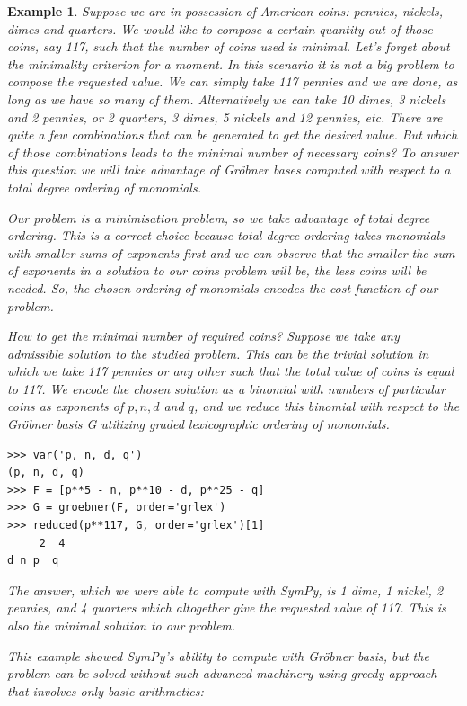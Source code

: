 \documentclass[12pt]{article}
\newtheorem{example}[theorem]{Example}
\begin{document}
\begin{example}
{\rm
Suppose we are in possession of American coins: pennies, nickels,
dimes and quarters. We would like to compose a certain quantity out of
those coins, say 117, such that the number of coins used is
minimal. Let's forget about the minimality criterion for a moment. In
this scenario it is not a big problem to compose the requested
value. We can simply take 117 pennies and we are done, as long as we
have so many of them. Alternatively we can take 10 dimes, 3 nickels
and 2 pennies, or 2 quarters, 3 dimes, 5 nickels and 12 pennies,
etc. There are quite a few combinations that can be generated to get
the desired value. But which of those combinations leads to the
minimal number of necessary coins? To answer this question we will
take advantage of Gr\"obner bases computed with respect to a total
degree ordering of monomials.

Our problem is a minimisation problem, so we take advantage of total
degree ordering.
This is a correct choice because total degree ordering takes monomials
with smaller sums
of exponents first and we can observe that the smaller the sum of
exponents in a solution
to our coins problem will be, the less coins will be needed. So, the
chosen ordering of
monomials encodes the cost function of our problem.

How to get the minimal number of required coins? Suppose we take any
admissible solution
to the studied problem. This can be the trivial solution in which we
take 117 pennies or any
other such that the total value of coins is equal to 117. We encode
the chosen solution as a
binomial with numbers of particular coins as exponents of $p, n, d$ and
$q$, and we reduce this
binomial with respect to the Gr\"obner basis G utilizing
graded lexicographic ordering of monomials.


\begin{Verbatim}[fontsize=\scriptsize,fontfamily=courier,fontshape=tt,frame=single,label=SymPy]
>>> var('p, n, d, q')
(p, n, d, q)
>>> F = [p**5 - n, p**10 - d, p**25 - q]
>>> G = groebner(F, order='grlex')
>>> reduced(p**117, G, order='grlex')[1]
     2  4
d n p  q
\end{Verbatim}

\noindent
The answer, which we were able to compute with SymPy, is 1 dime, 1 nickel,
2 pennies, and 4 quarters which altogether give the requested value of 117.
This is also the minimal solution to our problem.

This example showed SymPy's ability to compute with Gr\"obner basis, but the
problem can be solved without such advanced machinery using greedy approach
that involves only basic arithmetics:

}
\end{example}
\end{document}

